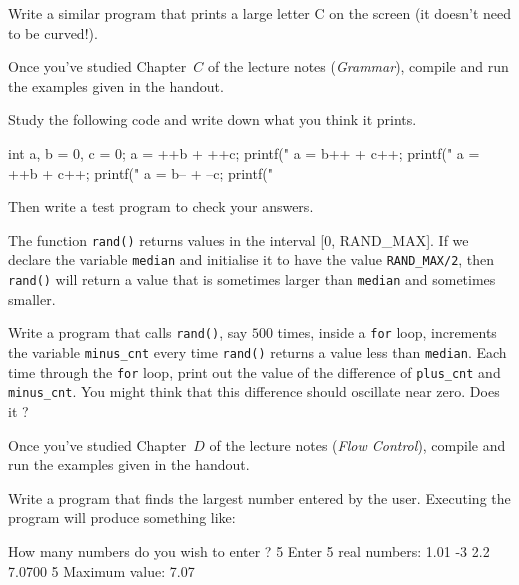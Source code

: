 \begin{exercise}
Write a similar program
that prints a large letter C on the screen (it doesn't need to be curved!).
\end{exercise}


\begin{exercise}
Once you've studied Chapter~$C$ of the lecture notes ({\em Grammar}), compile and run
the examples given in the handout.
\end{exercise}

Study the following code and write down what you think it prints.
\begin{codesnippet}
int a, b = 0, c = 0;
a = ++b + ++c;
printf("%
a = b++ + c++;
printf("%
a = ++b + c++;
printf("%
a = b-- + --c;
printf("%
\end{codesnippet}
\begin{exercise}
Then write a test program to check your answers.
\end{exercise}

The function \verb^rand()^ returns values in the interval [0, RAND\_MAX].
If we declare the variable \verb^median^ and initialise it to have the
value \verb^RAND_MAX/2^, then \verb^rand()^ will return a value
that is sometimes larger than \verb^median^ and sometimes smaller.

\begin{exercise}
Write a program that calls \verb^rand()^, say $500$ times,
inside a \verb^for^ loop, increments the variable \verb^minus_cnt^
every time \verb^rand()^ returns a value less than \verb^median^.
Each time through the \verb^for^ loop, print out the value of the difference
of \verb^plus_cnt^ and \verb^minus_cnt^.
You might think that this difference should oscillate near zero. Does it ?
\end{exercise}


\begin{exercise}
Once you've studied Chapter~$D$ of the lecture notes ({\em Flow Control}), compile and run
the examples given in the handout.
\end{exercise}

\begin{exercise}
Write a program that finds the largest number entered by the user.
Executing the program will produce something like:
\begin{codesnippet}
How many numbers do you wish to enter ? 5
Enter 5 real numbers: 1.01 -3 2.2 7.0700 5
Maximum value: 7.07
\end{codesnippet}
\end{exercise}

